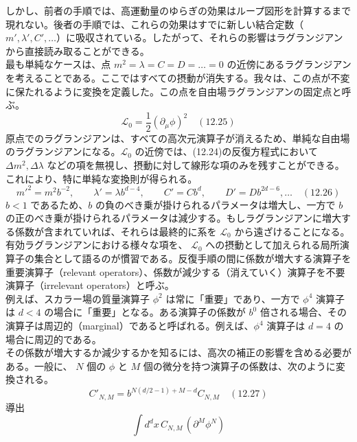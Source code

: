 \documentclass[uplatex,dvipdfmx]{jsarticle}
\begin{document}
しかし、前者の手順では、高運動量のゆらぎの効果はループ図形を計算するまで現れない。後者の手順では、これらの効果はすでに新しい結合定数（$m', \lambda', C', \dots$）に吸収されている。したがって、それらの影響はラグランジアンから直接読み取ることができる。\\
最も単純なケースは、点 $m^2 = \lambda = C = D = \dots = 0$ の近傍にあるラグランジアンを考えることである。ここではすべての摂動が消失する。我々は、この点が不変に保たれるように変換を定義した。この点を自由場ラグランジアンの固定点と呼ぶ。\\
\begin{equation}
    \mathcal{L}_0 = \frac{1}{2}(\partial_\mu \phi)^2 \quad (12.25)
\end{equation}
原点でのラグランジアンは、すべての高次元演算子が消えるため、単純な自由場のラグランジアンになる。$\mathcal{L}_0$ の近傍では、(12.24)の反復方程式において $\Delta m^2, \Delta \lambda$ などの項を無視し、摂動に対して線形な項のみを残すことができる。これにより、特に単純な変換則が得られる。
\begin{equation}
    m'^2 = m^2 b^{-2}, \qquad \lambda' = \lambda b^{d-4}, \qquad C' = C b^d, \qquad D' = D b^{2d-6}, \dots \quad (12.26)
\end{equation}
$b < 1$ であるため、$b$ の負のべき乗が掛けられるパラメータは増大し、一方で $b$ の正のべき乗が掛けられるパラメータは減少する。もしラグランジアンに増大する係数が含まれていれば、それらは最終的に系を $\mathcal{L}_0$ から遠ざけることになる。\\
有効ラグランジアンにおける様々な項を、 $\mathcal{L}_0$ への摂動として加えられる局所演算子の集合として語るのが慣習である。反復手順の間に係数が増大する演算子を重要演算子（relevant operators）、係数が減少する（消えていく）演算子を不要演算子（irrelevant operators）と呼ぶ。\\
例えば、スカラー場の質量演算子 $\phi^2$ は常に「重要」であり、一方で $\phi^4$ 演算子は $d < 4$ の場合に「重要」となる。ある演算子の係数が $b^0$ 倍される場合、その演算子は周辺的（marginal）であると呼ばれる。例えば、$\phi^4$ 演算子は $d=4$ の場合に周辺的である。\\
その係数が増大するか減少するかを知るには、高次の補正の影響を含める必要がある。一般に、 $N$ 個の $\phi$ と $M$ 個の微分を持つ演算子の係数は、次のように変換される。
\begin{equation}
    C'_{N,M} = b^{N(d/2 - 1) + M - d} C_{N,M} \quad (12.27)
\end{equation}
導出\\
\begin{equation}
    \int d^d x \, C_{N,M} \, (\partial^M \phi^N)
\end{equation}
\end{document}
